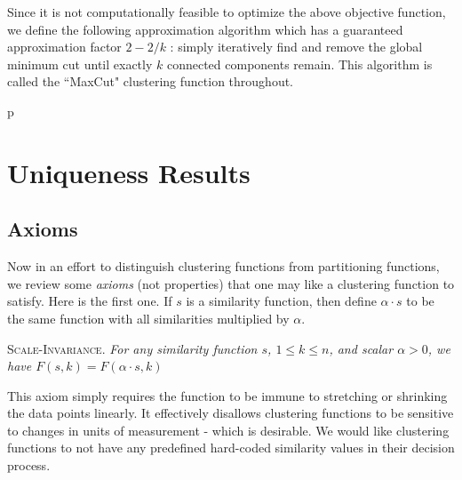 \documentclass[twoside,11pt]{article}
\begin{document}
Since it is not computationally feasible to optimize the above objective function, we define the following approximation algorithm which has a guaranteed approximation factor $2-2/k$ \citep{vaziranibook}: simply iteratively find and remove the global minimum cut until exactly $k$ connected components remain. This algorithm is called the ``MaxCut" clustering function throughout.

\begin{comment}
\algsetup{indent=2em}
\newcommand{\MaxSum}{\ensuremath{\mbox{\sc MaxSum}}}
\begin{algorithm}[h!]
\caption{$\MaxSum(s, k)$}\label{alg:MS}
\begin{algorithmic} [4]
\STATE Input: $s = \langle e_1, e_2, \ldots, e_{n \choose 2} \rangle$.
\STATE Output: The Max-Sum $k$-partitioning.
\medskip
\STATE $G \leftarrow G_s$
\STATE $i \leftarrow 1$
\WHILE{$i < k$}
	\STATE Let C be the global minimum cut in any component of $G$
	\STATE remove C from G
	\STATE $i \leftarrow i+1$
\ENDWHILE
\STATE Output the connected components of $G$
\end{algorithmic}
\end{algorithm}
\end{comment}p

\section{Uniqueness Results}

\subsection{Axioms}

Now in an effort to distinguish clustering functions from partitioning functions, we review some \textit{axioms} (not properties) that one may like a clustering function to satisfy. Here is the first one. If $s$ is a similarity function, then define $\alpha \cdot s$ to be the same function with all similarities multiplied by $\alpha$.
\begin{center}
\textsc{Scale-Invariance.} \textit{For any similarity function $s$, $1 \leq k \leq n$, and scalar $\alpha > 0$, we have $F(s,k) = F(\alpha \cdot s,k)$}
\end{center}

This axiom simply requires the function to be immune to stretching or shrinking the data points linearly. It effectively disallows clustering functions to be sensitive to changes in units of measurement - which is desirable. We would like clustering functions to not have any predefined hard-coded similarity values in their decision process.
\end{document}
